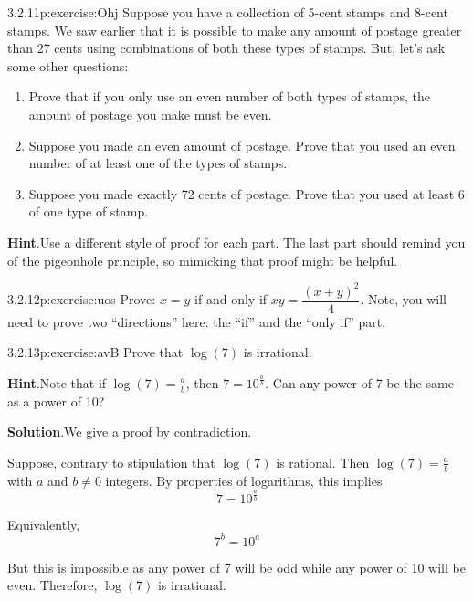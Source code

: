 \documentclass[twoside,11pt,]{book}
\newcommand{\blocktitlefont}{\relax}
\numberwithin{equation}{chapter}
\begin{document}
\begin{divisionsolution}{3.2.11}{}{p:exercise:Ohj}%
Suppose you have a collection of 5-cent stamps and 8-cent stamps. We saw earlier that it is possible to make any amount of postage greater than 27 cents using combinations of both these types of stamps. But, let's ask some other questions:%
\begin{enumerate}[label=(\alph*)]
\item{}Prove that if you only use an even number of both types of stamps, the amount of postage you make must be even.%
\item{}Suppose you made an even amount of postage. Prove that you used an even number of at least one of the types of stamps.%
\item{}Suppose you made exactly 72 cents of postage. Prove that you used at least 6 of one type of stamp.%
\end{enumerate}
%
\par\smallskip%
\noindent\textbf{\blocktitlefont Hint}.\quad{}Use a different style of proof for each part.  The last part should remind you of the pigeonhole principle, so mimicking that proof might be helpful.%
\end{divisionsolution}%
\begin{divisionsolution}{3.2.12}{}{p:exercise:uos}%
Prove: \(x=y\) if and only if \(xy=\dfrac{(x+y)^2}{4}\). Note, you will need to prove two ``directions'' here: the ``if'' and the ``only if'' part.%
\end{divisionsolution}%
\begin{divisionsolution}{3.2.13}{}{p:exercise:avB}%
Prove that \(\log(7)\) is irrational.%
\par\smallskip%
\noindent\textbf{\blocktitlefont Hint}.\quad{}Note that if \(\log(7) = \frac{a}{b}\), then \(7 = 10^\frac{a}{b}\).  Can any power of 7 be the same as a power of 10?%
\par\smallskip%
\noindent\textbf{\blocktitlefont Solution}.\quad{}We give a proof by contradiction.%
\begin{solutionproof}
Suppose, contrary to stipulation that \(\log(7)\) is rational. Then \(\log(7) = \frac{a}{b}\) with \(a\) and \(b \ne 0\) integers. By properties of logarithms, this implies%
\begin{equation*}
7 = 10^{\frac{a}{b}}
\end{equation*}
%
\par
Equivalently,%
\begin{equation*}
7^b = 10^a
\end{equation*}
%
\par
But this is impossible as any power of 7 will be odd while any power of 10 will be even. Therefore, \(\log(7)\) is irrational.%
\end{solutionproof}
\end{divisionsolution}%
\end{document}
